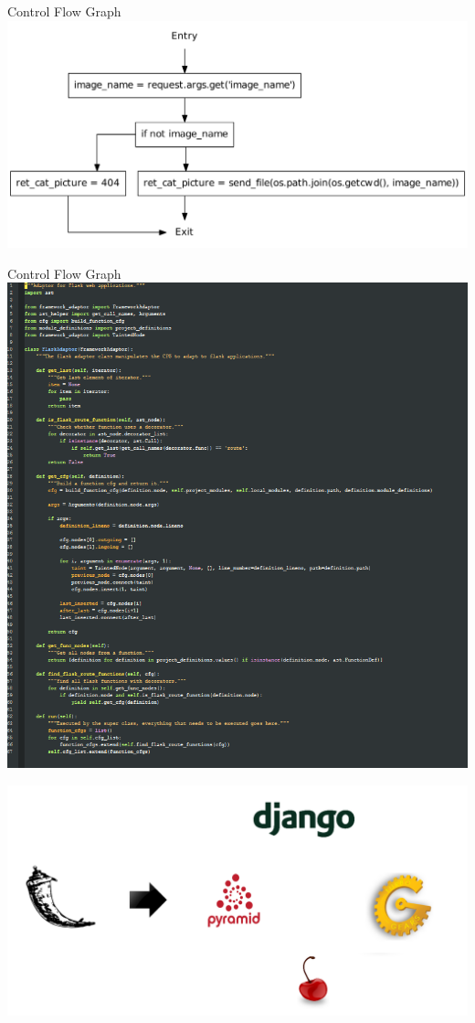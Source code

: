 \begin{frame}[plain]{Control Flow Graph}
  \center
  \includegraphics[height=0.6\textheight]{graphics/cfg_path_traversal.pdf}
\end{frame}


\begin{frame}[plain]{Control Flow Graph}
  \center
  \includegraphics[height=\textheight]{graphics/flask_adaptor_code.png}
\end{frame}


\begin{frame}
  \center
  \includegraphics[width=\textwidth]{graphics/adaptor}
\end{frame}
